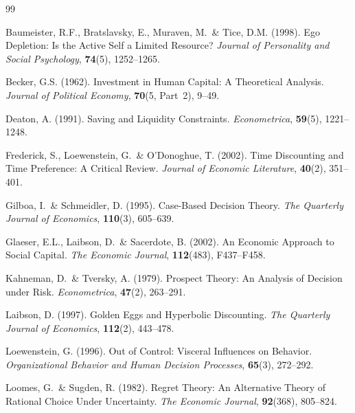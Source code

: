 \documentclass[11pt, a4paper]{article}
\begin{document}
\newpage
\begin{thebibliography}{99}

  Baumeister, R.F., Bratslavsky, E., Muraven, M.\ \& Tice, D.M. (1998).
  Ego Depletion: Is the Active Self a Limited Resource?
  \textit{Journal of Personality and Social Psychology}, \textbf{74}(5), 1252--1265.

  Becker, G.S. (1962).
  Investment in Human Capital: A Theoretical Analysis.
  \textit{Journal of Political Economy}, \textbf{70}(5, Part~2), 9--49.

  Deaton, A. (1991).
  Saving and Liquidity Constraints.
  \textit{Econometrica}, \textbf{59}(5), 1221--1248.

  Frederick, S., Loewenstein, G.\ \& O'Donoghue, T. (2002).
  Time Discounting and Time Preference: A Critical Review.
  \textit{Journal of Economic Literature}, \textbf{40}(2), 351--401.

  Gilboa, I.\ \& Schmeidler, D. (1995).
  Case-Based Decision Theory.
  \textit{The Quarterly Journal of Economics}, \textbf{110}(3), 605--639.

  Glaeser, E.L., Laibson, D.\ \& Sacerdote, B. (2002).
  An Economic Approach to Social Capital.
  \textit{The Economic Journal}, \textbf{112}(483), F437--F458.

  Kahneman, D.\ \& Tversky, A. (1979).
  Prospect Theory: An Analysis of Decision under Risk.
  \textit{Econometrica}, \textbf{47}(2), 263--291.

  Laibson, D. (1997).
  Golden Eggs and Hyperbolic Discounting.
  \textit{The Quarterly Journal of Economics}, \textbf{112}(2), 443--478.

  Loewenstein, G. (1996).
  Out of Control: Visceral Influences on Behavior.
  \textit{Organizational Behavior and Human Decision Processes},
  \textbf{65}(3), 272--292.

  Loomes, G.\ \& Sugden, R. (1982).
  Regret Theory: An Alternative Theory of Rational Choice Under Uncertainty.
  \textit{The Economic Journal}, \textbf{92}(368), 805--824.


\end{thebibliography}
\end{document}
